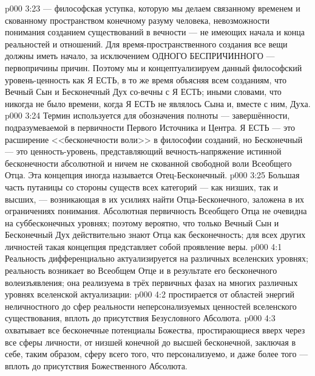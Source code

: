 \vs p000 3:23 \pc {} --- философская уступка, которую мы делаем связанному временем и скованному пространством конечному разуму человека, невозможности понимания созданием существований в вечности --- не имеющих начала и конца реальностей и отношений. Для время\hyp{}пространственного создания все вещи должны иметь начало, за исключением ОДНОГО БЕСПРИЧИННОГО --- первопричины причин. Поэтому мы и концептуализируем данный философский уровень\hyp{}ценность как Я ЕСТЬ, в то же время объясняя всем созданиям, что Вечный Сын и Бесконечный Дух со\hyp{}вечны с Я ЕСТЬ; иными словами, что никогда не было времени, когда Я ЕСТЬ не являлось  Сына и, вместе с ним, Духа.
\vs p000 3:24 \pc Термин  используется для обозначения полноты --- завершённости, подразумеваемой в первичности Первого Источника и Центра.  Я ЕСТЬ --- это расширение <<бесконечности воли>> в философии созданий, но Бесконечный --- это  ценность\hyp{}уровень, представляющий вечность\hyp{}напряжение истинной бесконечности абсолютной и ничем не скованной свободной воли Всеобщего Отца. Эта концепция иногда называется Отец\hyp{}Бесконечный.
\vs p000 3:25 Большая часть путаницы со стороны существ всех категорий --- как низших, так и высших, --- возникающая в их усилиях найти Отца\hyp{}Бесконечного, заложена в их ограничениях понимания. Абсолютная первичность Всеобщего Отца не очевидна на суббесконечных уровнях; поэтому вероятно, что только Вечный Сын и Бесконечный Дух действительно знают Отца как бесконечность; для всех других личностей такая концепция представляет собой проявление веры.
\vs p000 4:1 Реальность дифференциально актуализируется на различных вселенских уровнях; реальность возникает во Всеобщем Отце и в результате его бесконечного волеизъявления; она реализуема в трёх первичных фазах на многих различных уровнях вселенской актуализации:
\vs p000 4:2  простирается от областей энергий неличностного до сфер реальности неперсонализуемых ценностей вселенского существования, вплоть до присутствия Безусловного Абсолюта.
\vs p000 4:3  охватывает все бесконечные потенциалы Божества, простирающиеся вверх через все сферы личности, от низшей конечной до высшей бесконечной, заключая в себе, таким образом, сферу всего того, что персонализуемо, и даже более того --- вплоть до присутствия Божественного Абсолюта.
